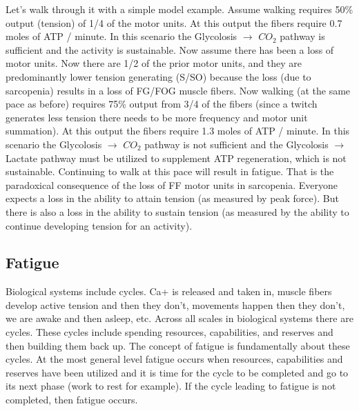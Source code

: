Let's walk through it with a simple model example. Assume walking requires 50\% output (tension) of 1/4 of the motor units. At this output the fibers require 0.7 moles of ATP / minute. In this scenario the Glycolosis $\rightarrow$ $CO_2$ pathway is sufficient and the activity is sustainable. Now assume there has been a loss of motor units. Now there are 1/2 of the prior motor units, and they are predominantly lower tension generating (S/SO) because the loss (due to sarcopenia) results in a loss of FG/FOG muscle fibers. Now walking (at the same pace as before) requires 75\% output from 3/4 of the fibers (since a twitch generates less tension there needs to be more frequency and motor unit summation). At this output the fibers require 1.3 moles of ATP / minute. In this scenario the Glycolosis $\rightarrow$ $CO_2$ pathway is not sufficient and the Glycolosis $\rightarrow$ Lactate pathway must be utilized to supplement ATP regeneration, which is not sustainable. Continuing to walk at this pace will result in fatigue. That is the paradoxical consequence of the loss of FF motor units in sarcopenia. Everyone expects a loss in the ability to attain tension (as measured by peak force). But there is also a loss in the ability to sustain tension (as measured by the ability to continue developing tension for an activity).


\subsection{Fatigue}


Biological systems include cycles. Ca+ is released and taken in, muscle fibers develop active tension and then they don't, movements happen then they don't, we are awake and then asleep, etc. Across all scales in biological systems there are cycles. These cycles include spending resources, capabilities, and reserves and then building them back up. The concept of fatigue is fundamentally about these cycles. At the most general level fatigue occurs when resources, capabilities and reserves have been utilized and it is time for the cycle to be completed and go to its next phase (work to rest for example). If the cycle leading to fatigue is not completed, then fatigue occurs.

